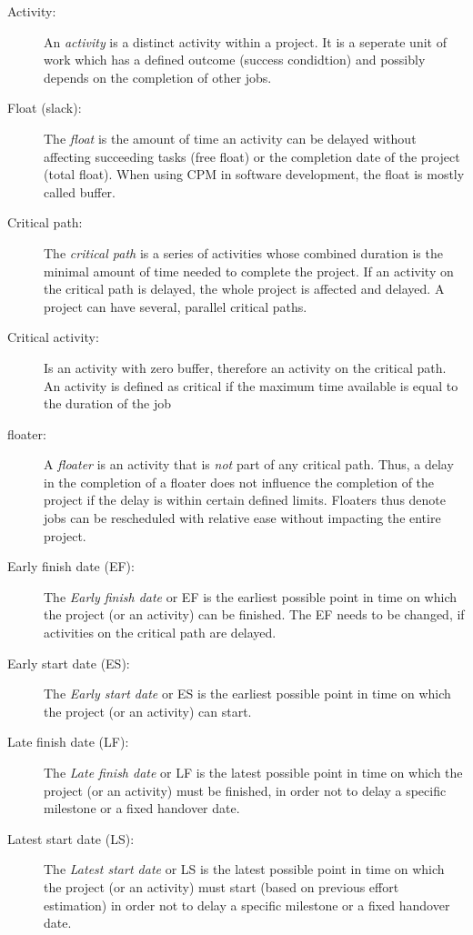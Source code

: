 \begin{description}
  \item[Activity:] An \emph{activity} is a distinct activity within a project. It is a seperate unit of work
    which has a defined outcome (success condidtion) and possibly depends on the completion of other
    jobs.
  \item[Float (slack):] The \emph{float} is the amount of time an activity can be delayed without
    affecting succeeding tasks (free float) or the completion date of the project (total float).
    When using CPM in software development, the float is mostly called buffer. 
  \item[Critical path:] The \emph{critical path} is a series of activities whose combined duration is the minimal
    amount of time needed to complete the project.  If an activity on the critical path is delayed,
    the whole project is affected and delayed. A project can have several, parallel critical paths.
  \item[Critical activity:] Is an activity with zero buffer, therefore an activity on the critical
    path. An activity is defined as critical if the maximum time available is equal to the duration of the job\cite[p.
        163]{Kelley:1959:CPS:1460299.1460318}
  \item[floater:] A \emph{floater} is an activity that is \emph{not} part of any critical path. Thus, a delay in the
    completion of a floater does not influence the completion of the project if the delay is within
    certain defined limits. Floaters thus denote jobs can be rescheduled with relative ease without impacting the entire project.
  \item[Early finish date (EF):] The \emph{Early finish date} or EF is the earliest possible point 
    in time on which the project (or an activity) can be finished. The EF needs to be changed, if
    activities on the critical path are delayed. 
  \item[Early start date (ES):] The \emph{Early start date} or ES is the earliest possible point in
    time on which the project (or an activity) can start. 
  \item[Late finish date (LF):] The \emph{Late finish date} or LF is the latest possible point in
    time on which the project (or an activity) must be finished, in order not to delay a specific
    milestone or a fixed handover date.
  \item[Latest start date (LS):] The \emph{Latest start date} or LS is the latest possible point in
    time on which the project (or an activity) must start (based on previous effort estimation) in
    order not to delay a specific milestone or a fixed handover date.
\end{description}

